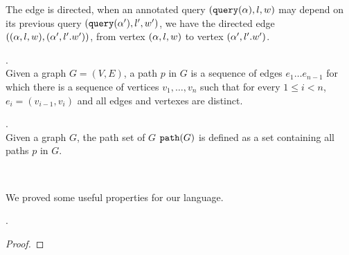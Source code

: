 \documentclass[a4paper,11pt]{article}
\begin{document}
The edge is directed, when an annotated query $({\tt query}({\alpha}),l,w)$ may depend on its previous query $({\tt query}({\alpha}'),l',w')$, we have the directed
edge $(({\alpha},l,w), ({\alpha}',l'.w'))$, 
from vertex $(\alpha,l,w) $ to vertex $({\alpha}',l'.w')$.
%
%
\begin{defn}[path ($p$)].
\\
Given a graph $G=(V,E)$, a path $p$ in $G$ is a sequence of edges $e_1\ldots e_{n - 1}$ for which there is a sequence of vertices $v_1, \ldots, v_n$ 
such that for every $1 \leq i < n$, $e_i=(v_{i-1},v_{i})$  and all edges and vertexes are distinct.
\end{defn}
%
\begin{defn}.
\\
Given a graph $G$, the path set of $G$ $\mathtt{path}(G)$ is defined as a set containing all paths $p$ in $G$.
\end{defn}

%
%
\begin{defn}
\label{def:trace-based_adapt}
\\
\end{defn}
%
We proved some useful properties for our language.
\begin{lem}
.
\\
\end{lem}
%
\begin{proof}
\end{proof}
%
\end{document}
